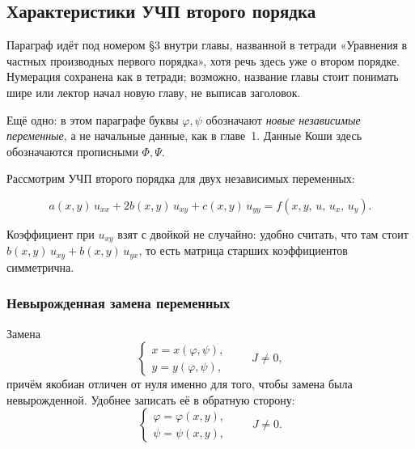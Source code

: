 \subsection{Характеристики УЧП второго порядка}

\begin{warn}
Параграф идёт под номером \S3 внутри главы, названной в тетради «Уравнения в
частных производных первого порядка», хотя речь здесь уже о втором порядке.
Нумерация сохранена как в тетради; возможно, название главы стоит понимать
шире или лектор начал новую главу, не выписав заголовок.

\medskip
Ещё одно: в этом параграфе буквы $\varphi, \psi$ обозначают \emph{новые
независимые переменные}, а не начальные данные, как в главе~1. Данные Коши
здесь обозначаются прописными $\Phi, \Psi$.
\end{warn}

Рассмотрим УЧП второго порядка для двух независимых переменных:

\begin{equation}\tag{1}\label{eq:so-main}
  a(x,y)\, u_{xx} + 2b(x,y)\, u_{xy} + c(x,y)\, u_{yy}
  = f(x,y,\,u,\,u_x,\,u_y) .
\end{equation}

\begin{remark}
Коэффициент при $u_{xy}$ взят с двойкой не случайно: удобно считать, что там
стоит $b(x,y)\,u_{xy} + b(x,y)\,u_{yx}$, то есть матрица старших коэффициентов
симметрична.
\end{remark}

\subsubsection*{Невырожденная замена переменных}

Замена
\[
  \begin{cases} x = x(\varphi,\psi), \\ y = y(\varphi,\psi), \end{cases}
  \qquad J \ne 0 ,
\]
причём якобиан отличен от нуля именно для того, чтобы замена была
невырожденной. Удобнее записать её в обратную сторону:
\[
  \begin{cases} \varphi = \varphi(x,y), \\ \psi = \psi(x,y), \end{cases}
  \qquad J \ne 0 .
\]

